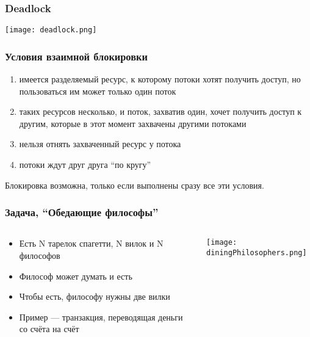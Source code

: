 \documentclass{../../slides-style}
\begin{document}
    \begin{frame}[plain]
        \titlepage
    \end{frame}

    \begin{frame}
        \frametitle{Deadlock}
        \begin{center}
            \texttt{[image: deadlock.png]}
        \end{center}
    \end{frame}
    
    \begin{frame}
        \frametitle{Условия взаимной блокировки}
        \begin{enumerate}
            \item имеется разделяемый ресурс, к которому потоки хотят получить доступ, но пользоваться им может только один поток
            \item таких ресурсов несколько, и поток, захватив один, хочет получить доступ к другим, которые в этот момент захвачены другими потоками
            \item нельзя отнять захваченный ресурс у потока
            \item потоки ждут друг друга \enquote{по кругу}
        \end{enumerate}
        Блокировка возможна, только если выполнены сразу все эти условия.
    \end{frame}

    \begin{frame}
        \frametitle{Задача, \enquote{Обедающие философы}}
        \begin{columns}
            \begin{column}{0.5\textwidth}
                \begin{itemize}
                    \item Есть N тарелок спагетти, N вилок и N философов
                    \item Философ может думать и есть
                    \item Чтобы есть, философу нужны две вилки
                    \item Пример --- транзакция, переводящая деньги со счёта на счёт
                \end{itemize}
            \end{column}
            \begin{column}{0.5\textwidth}
                \texttt{[image: diningPhilosophers.png]}
            \end{column}
        \end{columns}
    \end{frame}
\end{document}
